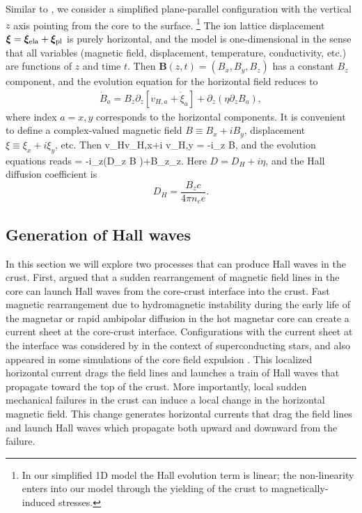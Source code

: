 Similar to \citet{2004ApJ...609..999C},
we consider a simplified plane-parallel configuration with the vertical $z$ axis pointing
from the core to the surface. 
\footnote{In our simplified 1D model the Hall evolution term is linear; the non-linearity enters into our model through the yielding of the crust to magnetically-induced stresses.}
The ion lattice displacement 
$\boldsymbol{\xi}=\boldsymbol{\xi}_{\rm ela}+\boldsymbol{\xi}_{\rm pl}$ 
is purely horizontal, and the model is one-dimensional in the sense that all variables  
(magnetic field, displacement, temperature, conductivity, etc.) are functions of $z$ and 
time $t$. Then $\boldsymbol{B}(z,t)=(B_x,B_y,B_z)$ has a constant $B_z$ component, and the evolution 
equation for the horizontal field reduces to
\begin{eqnarray}\label{vel}
\dot{B}_a=B_z\partial_z \left[v_{H,a}+\dot{\xi}_a\right]+\partial_z\left(\eta\partial_z B_a\right),
\end{eqnarray}
where 
index $a=x,y$ corresponds to the horizontal components.
It is convenient to define a complex-valued magnetic field $B\equiv B_x+i B_y$, displacement $\xi\equiv\xi_x+i\xi_y$, etc. 
Then
\beq
v_H\equiv v_{H,x}+i v_{H,y} = -i\partial_z B,
\eeq
and the evolution equations reads
\beq
\label{hall}
= -i\partial_z\left(D\partial_z B \right)+B_z\partial_z\dot{\xi}.
\eeq
Here $D=D_H+i\eta$, 
and the Hall diffusion coefficient is
\begin{equation}
 D_{H}=\frac{B_z c}{4\pi n_e e}.
\end{equation}
 
\subsection{Generation of Hall waves}\label{generation}
In this section we will explore two processes that can produce Hall waves in the crust. 
First, \citet{1996ApJ...473..322T} argued that a sudden rearrangement of magnetic field 
lines in the core can launch Hall waves from the core-crust interface into the crust. 
Fast magnetic rearrangement due to hydromagnetic instability during 
the early life of the
magnetar or rapid ambipolar diffusion in the hot magnetar core 
\citep{1992ApJ...395..250G,2016ApJ...833..261B} 
can create a current sheet at the core-crust interface. 
Configurations with the current sheet at the interface was considered by \citet{2013PhRvL.110g1101L,2015MNRAS.453..671G} in the context of superconducting stars, and also appeared in some simulations of the core field expulsion \citep{2016MNRAS.456.4461E}.
This localized horizontal current drags the field lines and launches 
a train of Hall waves that propagate toward the top of the crust.
More importantly, local sudden mechanical failures in the crust can induce a
local change in the horizontal magnetic field. This change generates horizontal currents 
that drag the field lines and launch Hall waves which propagate both upward and downward
from the failure.

